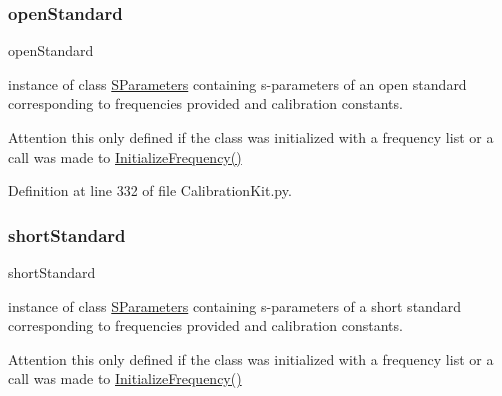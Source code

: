 \subsubsection{\texorpdfstring{open\+Standard}{openStandard}}
{\footnotesize\ttfamily open\+Standard}



instance of class \hyperlink{namespaceSignalIntegrity_1_1SParameters}{S\+Parameters} containing s-\/parameters of an open standard corresponding to frequencies provided and calibration constants. 

\begin{DoxyAttention}{Attention}
this only defined if the class was initialized with a frequency list or a call was made to \hyperlink{classSignalIntegrity_1_1Measurement_1_1CalKit_1_1CalibrationKit_1_1CalibrationKit_a068ffbf43377a9e28cccb8b6013772ea}{Initialize\+Frequency()} 
\end{DoxyAttention}


Definition at line 332 of file Calibration\+Kit.\+py.

\mbox{\label{classSignalIntegrity_1_1Measurement_1_1CalKit_1_1CalibrationKit_1_1CalibrationKit_a094c01f8f3b9b22b8759481b3d5bdb85}} 
\subsubsection{\texorpdfstring{short\+Standard}{shortStandard}}
{\footnotesize\ttfamily short\+Standard}



instance of class \hyperlink{namespaceSignalIntegrity_1_1SParameters}{S\+Parameters} containing s-\/parameters of a short standard corresponding to frequencies provided and calibration constants. 

\begin{DoxyAttention}{Attention}
this only defined if the class was initialized with a frequency list or a call was made to \hyperlink{classSignalIntegrity_1_1Measurement_1_1CalKit_1_1CalibrationKit_1_1CalibrationKit_a068ffbf43377a9e28cccb8b6013772ea}{Initialize\+Frequency()} 
\end{DoxyAttention}


